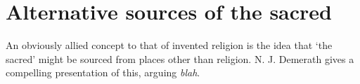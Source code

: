 \documentclass[Draft.tex]{subfiles}
\begin{document}
\section*{Alternative sources of the sacred}
An obviously allied concept to that of invented religion
is the idea that `the sacred' might be sourced
from places other than religion.
N. J. Demerath \parencite*{Demerath00} gives a compelling presentation
of this, arguing \textit{blah}.
\end{document}
